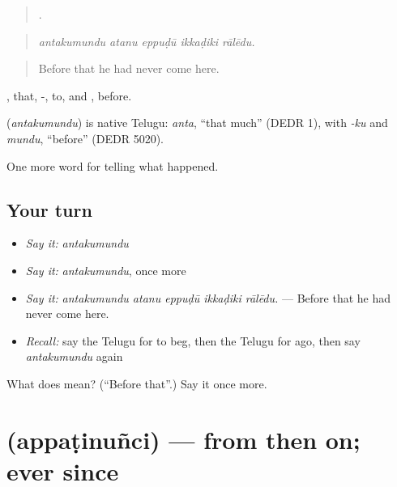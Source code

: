 \begin{quote}
    .
\end{quote}

\begin{quote}
\emph{antakumundu atanu eppuḍū ikkaḍiki rālēdu.}
\end{quote}

\begin{quote}
Before that he had never come here.
\end{quote}

, that, -, to, and , before.

\begin{cousinweb}
\textbf{} (\emph{antakumundu}) is native Telugu: \emph{anta}, \textquotedblleft{}that much\textquotedblright{} (DEDR 1), with \emph{-ku} and \emph{mundu}, \textquotedblleft{}before\textquotedblright{} (DEDR 5020).
\end{cousinweb}

\begin{grammarlens}[title={What you've built}]
One more word for telling what happened.
\end{grammarlens}

\subsection*{Your turn}
\begin{itemize}
\raggedright
  \item \emph{Say it:} \emph{antakumundu}
  \item \emph{Say it:} \emph{antakumundu}, once more
  \item \emph{Say it:} \emph{antakumundu atanu eppuḍū ikkaḍiki rālēdu.} — Before that he had never come here.
  \item \emph{Recall:} say the Telugu for to beg, then the Telugu for ago, then say \emph{antakumundu} again
\end{itemize}

\begin{tcolorbox}[breakable,colback=teal!4,colframe=teal!35!black,title={Before you move on}]
What does  mean? (\textquotedblleft{}Before that\textquotedblright{}.) Say it once more.
\end{tcolorbox}
\section[\texorpdfstring{\te{అప్పటినుంచి} (appaṭinuñci)}{అప్పటినుంచి (appaṭinuñci)}]{ (appaṭinuñci) — from then on; ever since}


